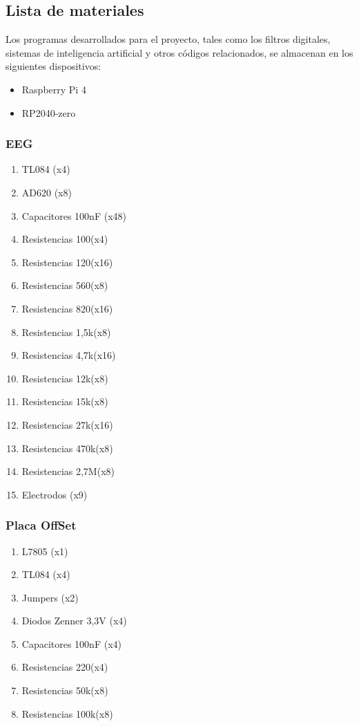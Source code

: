 \documentclass{article}
\begin{document}
\subsection{Lista de materiales}
Los programas desarrollados para el proyecto, tales como los filtros digitales, sistemas de inteligencia artificial y otros códigos relacionados, se almacenan en los siguientes dispositivos:

\begin{itemize}
    \item Raspberry Pi 4
    \item RP2040-zero
\end{itemize}

\subsubsection{EEG}
\begin{enumerate}
    \item TL084 (x4)
    \item AD620 (x8)
    \item Capacitores 100nF (x48)
    \item Resistencias 100\Ω (x4)
    \item Resistencias 120\Ω (x16)
    \item Resistencias 560\Ω (x8) 
    \item Resistencias 820\Ω (x16)
    \item Resistencias 1,5k\Ω (x8)
    \item Resistencias 4,7k\Ω (x16)
    \item Resistencias 12k\Ω (x8)
    \item Resistencias 15k\Ω (x8)
    \item Resistencias 27k\Ω (x16)
    \item Resistencias 470k\Ω (x8)
    \item Resistencias 2,7M\Ω (x8)
    \item Electrodos (x9)
\end{enumerate}

\subsubsection{Placa OffSet}
\begin{enumerate}
    \item L7805 (x1)
    \item TL084 (x4)
    \item Jumpers (x2)
    \item Diodos Zenner 3,3V (x4)
    \item Capacitores 100nF (x4)
    \item Resistencias 220\Ω (x4)
    \item Resistencias 50k\Ω (x8)
    \item Resistencias 100k\Ω (x8)
\end{enumerate}
\end{document}
